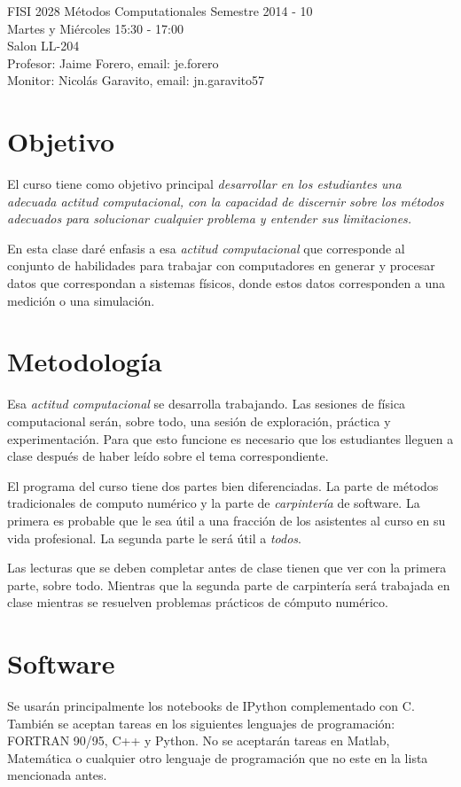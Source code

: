 \documentclass[11pt]{article}
\begin{document}
\noindent
FISI 2028 M\'etodos Computationales
Semestre 2014 - 10\\
Martes y Mi\'ercoles 15:30 - 17:00 \\
Salon LL-204\\
Profesor: Jaime Forero, email: je.forero\\
Monitor: Nicol\'as Garavito, email: jn.garavito57\\



\section*{Objetivo}
El curso tiene como objetivo principal \emph{desarrollar en los
  estudiantes una adecuada actitud computacional, con la capacidad de
  discernir sobre los m\'etodos adecuados para solucionar cualquier
  problema y entender sus limitaciones.} 
 
En esta clase dar\'e enfasis a esa \emph{actitud computacional} que
corresponde al conjunto de habilidades para trabajar con computadores
en generar y procesar datos que correspondan a sistemas f\'isicos,
donde estos datos corresponden a una medici\'on o una simulaci\'on. 

\section*{Metodolog\'ia}
Esa \emph{actitud computacional} se desarrolla trabajando. Las
sesiones de f\'isica computacional ser\'an, sobre todo, una sesi\'on
de exploraci\'on, pr\'actica y experimentaci\'on. Para que esto
funcione es necesario que los estudiantes lleguen a clase despu\'es de
haber le\'ido sobre el tema correspondiente. 

El programa del curso tiene dos partes bien diferenciadas. La parte de
m\'etodos tradicionales de computo num\'erico y la parte de
\emph{carpinter\'ia} de software. La primera es probable que le sea
\'util a una fracci\'on de los asistentes al curso en su vida
profesional. La segunda parte le ser\'a \'util a \emph{todos}. 

Las lecturas que se deben completar antes de clase tienen que ver con
la primera parte, sobre todo. Mientras que la segunda parte de
carpinter\'ia ser\'a trabajada en clase mientras se resuelven
problemas pr\'acticos de c\'omputo num\'erico. 

\section*{Software}
\noindent Se usar\'an principalmente los notebooks de IPython
complementado con C. Tambi\'en se aceptan tareas en los siguientes
lenguajes de programaci\'on: FORTRAN 90/95, C++ y Python. No se
aceptar\'an tareas en Matlab, Matem\'atica o cualquier otro lenguaje
de programaci\'on que no este en la lista mencionada antes.  
\end{document}
